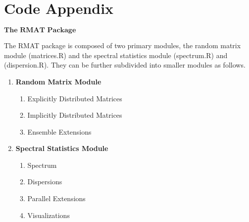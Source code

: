\chapter{Code Appendix}

$\textbf{The RMAT Package}$ \hfill \newline

\noindent
The RMAT package is composed of two primary modules, the random matrix module (matrices.R) and the spectral statistics module (spectrum.R) and (dispersion.R). They can be further subdivided into smaller modules as follows.

\begin{enumerate}
  \item \textbf{Random Matrix Module}
    \begin{enumerate}
      \item Explicitly Distributed Matrices
      \item Implicitly Distributed Matrices
      \item Ensemble Extensions
    \end{enumerate}

  \item \textbf{Spectral Statistics Module}
    \begin{enumerate}
      \item Spectrum
      \item Dispersions
      \item Parallel Extensions
      \item Visualizations
    \end{enumerate}
\end{enumerate}



